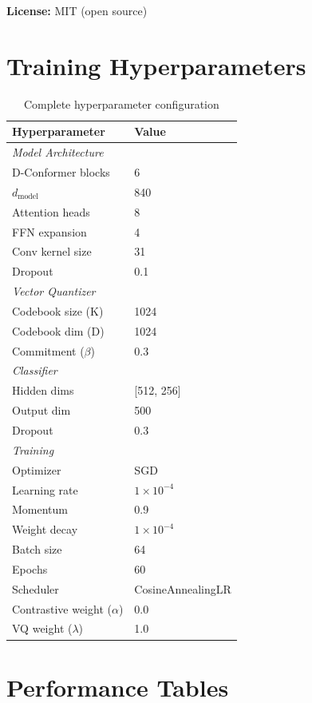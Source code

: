 \documentclass[12pt,a4paper]{article}
\begin{document}
\textbf{License:} MIT (open source)

\appendix

\section{Training Hyperparameters}

\begin{table}[H]
\centering
\begin{tabular}{ll}
\toprule
\textbf{Hyperparameter} & \textbf{Value} \\
\midrule
\multicolumn{2}{l}{\textit{Model Architecture}} \\
D-Conformer blocks & 6 \\
$d_{\text{model}}$ & 840 \\
Attention heads & 8 \\
FFN expansion & 4 \\
Conv kernel size & 31 \\
Dropout & 0.1 \\
\midrule
\multicolumn{2}{l}{\textit{Vector Quantizer}} \\
Codebook size (K) & 1024 \\
Codebook dim (D) & 1024 \\
Commitment ($\beta$) & 0.3 \\
\midrule
\multicolumn{2}{l}{\textit{Classifier}} \\
Hidden dims & [512, 256] \\
Output dim & 500 \\
Dropout & 0.3 \\
\midrule
\multicolumn{2}{l}{\textit{Training}} \\
Optimizer & SGD \\
Learning rate & $1 \times 10^{-4}$ \\
Momentum & 0.9 \\
Weight decay & $1 \times 10^{-4}$ \\
Batch size & 64 \\
Epochs & 60 \\
Scheduler & CosineAnnealingLR \\
Contrastive weight ($\alpha$) & 0.0 \\
VQ weight ($\lambda$) & 1.0 \\
\bottomrule
\end{tabular}
\caption{Complete hyperparameter configuration}
\end{table}

\section{Performance Tables}
\end{document}
